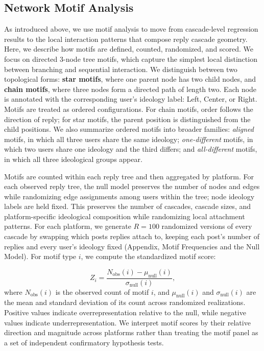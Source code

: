 \documentclass[letterpaper]{article} %
\newcommand{\rev}[1]{{\color{blue}#1}}
\begin{document}
\subsection{Network Motif Analysis}
As introduced above, we use motif analysis to move from cascade-level regression results to the local interaction patterns that compose reply cascade geometry. Here, we describe how motifs are defined, counted, randomized, and scored. We focus on directed 3-node tree motifs, which capture the simplest local distinction between branching and sequential interaction. We distinguish between two topological forms: \textbf{star motifs}, where one parent node has two child nodes, and \textbf{chain motifs}, where three nodes form a directed path of length two. Each node is annotated with the corresponding user's ideology label: Left, Center, or Right. Motifs are treated as ordered configurations. For chain motifs, order follows the direction of reply; for star motifs, the parent position is distinguished from the child positions. We also summarize ordered motifs into broader families: \textit{aligned} motifs, in which all three users share the same ideology; \textit{one-different} motifs, in which two users share one ideology and the third differs; and \textit{all-different} motifs, in which all three ideological groups appear.

Motifs are counted within each reply tree and then aggregated by platform. For each observed reply tree, the null model preserves the number of nodes and edges while randomizing edge assignments among users within the tree; node ideology labels are held fixed. This preserves the number of cascades, cascade sizes, and platform-specific ideological composition while randomizing local attachment patterns. \rev{For each platform, we generate $R=100$ randomized versions of every cascade by swapping which posts replies attach to, keeping each post's number of replies and every user's ideology fixed (Appendix, Motif Frequencies and the Null Model).} For motif type $i$, we compute the standardized motif score:

\[
Z_i = \frac{N_{\mathrm{obs}}(i) - \mu_{\mathrm{null}}(i)}{\sigma_{\mathrm{null}}(i)} ,
\]
where $N_{\mathrm{obs}}(i)$ is the observed count of motif $i$, and $\mu_{\mathrm{null}}(i)$ and $\sigma_{\mathrm{null}}(i)$ are the mean and standard deviation of its count across randomized realizations. Positive values indicate overrepresentation relative to the null, while negative values indicate underrepresentation. We interpret motif scores by their relative direction and magnitude across platforms rather than treating the motif panel as a set of independent confirmatory hypothesis tests.
\end{document}
